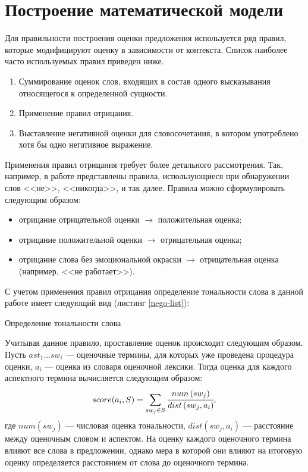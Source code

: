 \section{Построение математической модели}
Для правильности построения оценки предложения используется ряд правил, которые модифицируют оценку в зависимости от контекста. Список наиболее часто используемых правил приведен ниже. 
\begin{enumerate}
	\item Суммирование оценок слов, входящих в состав одного высказывания относящегося к определенной сущности.
	\item Применение правил отрицания. 
	\item Выставление негативной оценки для словосочетания, в котором употреблено хотя бы одно негативное выражение.\cite{mark}
\end{enumerate}
Применения правил отрицания требует более детального рассмотрения. Так, например, в работе \cite{negation} представлены правила, использующиеся при обнаружении слов <<не>>, <<никогда>>, и так далее. Правила можно сформулировать следующим образом:
\begin{itemize}
	\item отрицание отрицательной оценки $\rightarrow$ положительная оценка;
	\item отрицание положительной оценки $\rightarrow$ отрицательная оценка;
	\item отрицание слова без эмоциональной окраски $\rightarrow$ отрицательная оценка (например, <<не работает>>). 
\end{itemize}
С учетом применения правил отрицания определение тональности слова в данной работе имеет следующий вид (листинг \ref{nego-list}):

\begin{algorithm}[H]
	\caption{Определение тональности слова}\label{nego-list}
	\begin{algorithmic}
		\Else
		\EndIf
		\EndProcedure
	\end{algorithmic}
\end{algorithm}

Учитывая данное правило, проставление оценок происходит следующим образом. Пусть $ast_1 \dots sw_i$ --- оценочные термины, для которых уже проведена процедура оценки, $a_i$ --- оценка из словаря оценочной лексики. Тогда оценка для каждого аспектного термина вычисляется следующим образом: 
\begin{equation}
	score(a_i, S) = \sum_{sw_j \in S}\cfrac{num\left(sw_j\right)}{dist\left( sw_j, a_i\right)},
\end{equation}
где $num\left(sw_j\right)$ --- числовая оценка тональности, $dist\left( sw_j, a_i\right)$ --- расстояние между оценочным словом и аспектом. На оценку каждого оценочного термина влияют все слова в предложении, однако мера в которой они влияют на итоговую оценку определяется расстоянием от слова до оценочного термина. 

